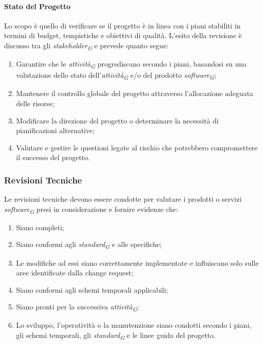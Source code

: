 \paragraph{Stato del Progetto}
Lo scopo è quello di verificare se il progetto è in linea con i piani stabiliti in termini di budget, tempistiche e obiettivi di qualità.
L'esito della revisione è discusso tra gli \textit{stakeholder}\textsubscript{\textit{G}} e prevede quanto segue:
\begin{enumerate}
    \item Garantire che le \textit{attività}\textsubscript{\textit{G}} progrediscano secondo i piani, basandosi su una valutazione dello stato dell'\textit{attività}\textsubscript{\textit{G}} e/o del prodotto \textit{software}\textsubscript{\textit{G}};
    \item Mantenere il controllo globale del progetto attraverso l'allocazione adeguata delle risorse;
    \item Modificare la direzione del progetto o determinare la necessità di pianificazioni alternative;
    \item Valutare e gestire le questioni legate al rischio che potrebbero compromettere il successo del progetto.
\end{enumerate}

\subsubsection{Revisioni Tecniche}
Le revisioni tecniche devono essere condotte per valutare i prodotti o servizi \textit{software}\textsubscript{\textit{G}} presi in considerazione e fornire evidenze che:

\begin{enumerate}
    \item Siano completi;
    \item Siano conformi agli \textit{standard}\textsubscript{\textit{G}} e alle specifiche;
    \item Le modifiche ad essi siano correttamente implementate e influiscano solo sulle aree identificate dalla change request;
    \item Siano conformi agli schemi temporali applicabili;
    \item Siano pronti per la successiva \textit{attività}\textsubscript{\textit{G}};
    \item Lo sviluppo, l'operatività o la manutenzione siano condotti secondo i piani, gli schemi temporali, gli \textit{standard}\textsubscript{\textit{G}} e le linee guida del progetto.
\end{enumerate}

